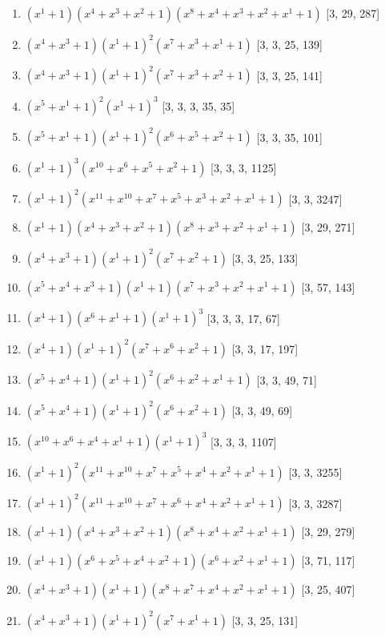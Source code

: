 \documentclass[10pt,twocolumn]{article}
\begin{document}
\begin{enumerate}
\item $(x^{1} + 1)(x^{4} + x^{3} + x^{2} + 1)(x^{8} + x^{4} + x^{3} + x^{2} + x^{1} + 1)$  [3, 29, 287]
\item $(x^{4} + x^{3} + 1)(x^{1} + 1)^{2}(x^{7} + x^{3} + x^{1} + 1)$  [3, 3, 25, 139]
\item $(x^{4} + x^{3} + 1)(x^{1} + 1)^{2}(x^{7} + x^{3} + x^{2} + 1)$  [3, 3, 25, 141]
\item $(x^{5} + x^{1} + 1)^{2}(x^{1} + 1)^{3}$  [3, 3, 3, 35, 35]
\item $(x^{5} + x^{1} + 1)(x^{1} + 1)^{2}(x^{6} + x^{5} + x^{2} + 1)$  [3, 3, 35, 101]
\item $(x^{1} + 1)^{3}(x^{10} + x^{6} + x^{5} + x^{2} + 1)$  [3, 3, 3, 1125]
\item $(x^{1} + 1)^{2}(x^{11} + x^{10} + x^{7} + x^{5} + x^{3} + x^{2} + x^{1} + 1)$  [3, 3, 3247]
\item $(x^{1} + 1)(x^{4} + x^{3} + x^{2} + 1)(x^{8} + x^{3} + x^{2} + x^{1} + 1)$  [3, 29, 271]
\item $(x^{4} + x^{3} + 1)(x^{1} + 1)^{2}(x^{7} + x^{2} + 1)$  [3, 3, 25, 133]
\item $(x^{5} + x^{4} + x^{3} + 1)(x^{1} + 1)(x^{7} + x^{3} + x^{2} + x^{1} + 1)$  [3, 57, 143]
\item $(x^{4} + 1)(x^{6} + x^{1} + 1)(x^{1} + 1)^{3}$  [3, 3, 3, 17, 67]
\item $(x^{4} + 1)(x^{1} + 1)^{2}(x^{7} + x^{6} + x^{2} + 1)$  [3, 3, 17, 197]
\item $(x^{5} + x^{4} + 1)(x^{1} + 1)^{2}(x^{6} + x^{2} + x^{1} + 1)$  [3, 3, 49, 71]
\item $(x^{5} + x^{4} + 1)(x^{1} + 1)^{2}(x^{6} + x^{2} + 1)$  [3, 3, 49, 69]
\item $(x^{10} + x^{6} + x^{4} + x^{1} + 1)(x^{1} + 1)^{3}$  [3, 3, 3, 1107]
\item $(x^{1} + 1)^{2}(x^{11} + x^{10} + x^{7} + x^{5} + x^{4} + x^{2} + x^{1} + 1)$  [3, 3, 3255]
\item $(x^{1} + 1)^{2}(x^{11} + x^{10} + x^{7} + x^{6} + x^{4} + x^{2} + x^{1} + 1)$  [3, 3, 3287]
\item $(x^{1} + 1)(x^{4} + x^{3} + x^{2} + 1)(x^{8} + x^{4} + x^{2} + x^{1} + 1)$  [3, 29, 279]
\item $(x^{1} + 1)(x^{6} + x^{5} + x^{4} + x^{2} + 1)(x^{6} + x^{2} + x^{1} + 1)$  [3, 71, 117]
\item $(x^{4} + x^{3} + 1)(x^{1} + 1)(x^{8} + x^{7} + x^{4} + x^{2} + x^{1} + 1)$  [3, 25, 407]
\item $(x^{4} + x^{3} + 1)(x^{1} + 1)^{2}(x^{7} + x^{1} + 1)$  [3, 3, 25, 131]

\end{enumerate}
\end{document}
